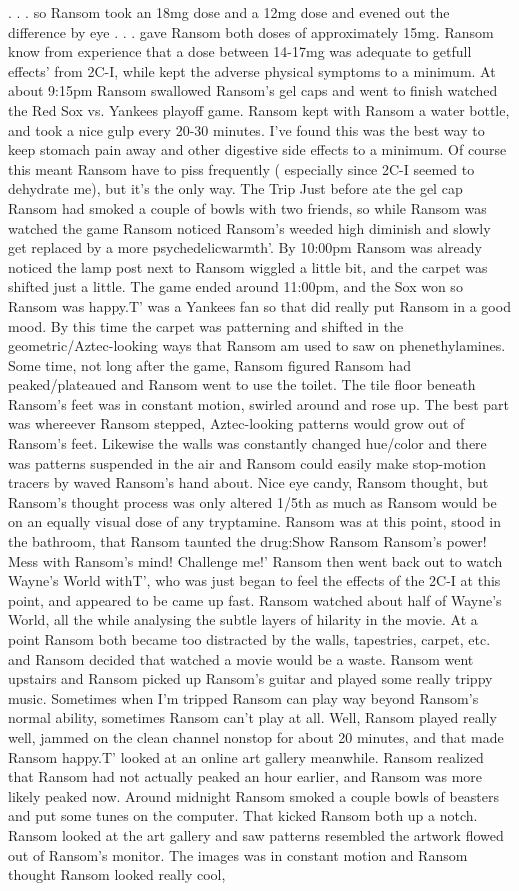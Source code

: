 \documentclass[12pt]{book}
\begin{document}
. . .  so Ransom took an 18mg dose and a 12mg dose and evened out the difference by eye . . .  gave Ransom both doses of approximately 15mg. Ransom know from experience that a dose between 14-17mg was adequate to getfull effects' from 2C-I, while kept the adverse physical symptoms to a minimum. At about 9:15pm Ransom swallowed Ransom's gel caps and went to finish watched the Red Sox vs. Yankees playoff game. Ransom kept with Ransom a water bottle, and took a nice gulp every 20-30 minutes. I've found this was the best way to keep stomach pain away and other digestive side effects to a minimum. Of course this meant Ransom have to piss frequently ( especially since 2C-I seemed to dehydrate me), but it's the only way. The Trip Just before ate the gel cap Ransom had smoked a couple of bowls with two friends, so while Ransom was watched the game Ransom noticed Ransom's weeded high diminish and slowly get replaced by a more psychedelicwarmth'. By 10:00pm Ransom was already noticed the lamp post next to Ransom wiggled a little bit, and the carpet was shifted just a little. The game ended around 11:00pm, and the Sox won so Ransom was happy.T' was a Yankees fan so that did really put Ransom in a good mood. By this time the carpet was patterning and shifted in the geometric/Aztec-looking ways that Ransom am used to saw on phenethylamines. Some time, not long after the game, Ransom figured Ransom had peaked/plateaued and Ransom went to use the toilet. The tile floor beneath Ransom's feet was in constant motion, swirled around and rose up. The best part was whereever Ransom stepped, Aztec-looking patterns would grow out of Ransom's feet. Likewise the walls was constantly changed hue/color and there was patterns suspended in the air and Ransom could easily make stop-motion tracers by waved Ransom's hand about. Nice eye candy, Ransom thought, but Ransom's thought process was only altered 1/5th as much as Ransom would be on an equally visual dose of any tryptamine. Ransom was at this point, stood in the bathroom, that Ransom taunted the drug:Show Ransom Ransom's power! Mess with Ransom's mind! Challenge me!' Ransom then went back out to watch Wayne's World withT', who was just began to feel the effects of the 2C-I at this point, and appeared to be came up fast. Ransom watched about half of Wayne's World, all the while analysing the subtle layers of hilarity in the movie. At a point Ransom both became too distracted by the walls, tapestries, carpet, etc. and Ransom decided that watched a movie would be a waste. Ransom went upstairs and Ransom picked up Ransom's guitar and played some really trippy music. Sometimes when I'm tripped Ransom can play way beyond Ransom's normal ability, sometimes Ransom can't play at all. Well, Ransom played really well, jammed on the clean channel nonstop for about 20 minutes, and that made Ransom happy.T' looked at an online art gallery meanwhile. Ransom realized that Ransom had not actually peaked an hour earlier, and Ransom was more likely peaked now. Around midnight Ransom smoked a couple bowls of beasters and put some tunes on the computer. That kicked Ransom both up a notch. Ransom looked at the art gallery and saw patterns resembled the artwork flowed out of Ransom's monitor. The images was in constant motion and Ransom thought Ransom looked really cool, 
\end{document}
